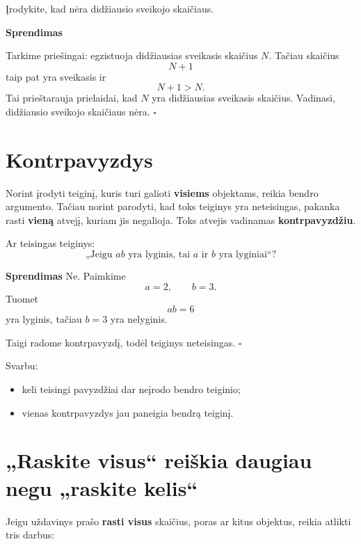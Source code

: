 \documentclass[11pt,a4paper]{scrartcl}
\newenvironment{solution}
    {\begin{list}{}{\setlength{\leftmargin}{10pt}\setlength{\rightmargin}{10pt}}\item[]}
    {\end{list}}
\begin{document}
\begin{example}
Įrodykite, kad nėra didžiausio sveikojo skaičiaus.
\end{example}

\begin{solution}
\textbf{Sprendimas}

Tarkime priešingai: egzistuoja didžiausias sveikasis skaičius $N$. Tačiau skaičius
\[
N+1
\]
taip pat yra sveikasis ir
\[
N+1>N.
\]
Tai prieštarauja prielaidai, kad $N$ yra didžiausias sveikasis skaičius.
Vadinasi, didžiausio sveikojo skaičiaus nėra. \hfill $\square$
\end{solution}

\section{Kontrpavyzdys}

Norint įrodyti teiginį, kuris turi galioti \textbf{visiems} objektams,
reikia bendro argumento. Tačiau norint parodyti, kad toks teiginys yra neteisingas, pakanka rasti
\textbf{vieną} atvejį, kuriam jis negalioja. Toks atvejis vadinamas \textbf{kontrpavyzdžiu}.

\begin{example}
Ar teisingas teiginys:
\[
\text{„Jeigu }ab\text{ yra lyginis, tai }a\text{ ir }b\text{ yra lyginiai“?}
\]
\end{example}

\begin{solution}
\textbf{Sprendimas}
Ne. Paimkime
\[
a=2,\qquad b=3.
\]
Tuomet
\[
ab=6
\]
yra lyginis, tačiau $b=3$ yra nelyginis.

Taigi radome kontrpavyzdį, todėl teiginys neteisingas. \hfill $\square$
\end{solution}

Svarbu:
\begin{itemize}
    \item keli teisingi pavyzdžiai dar neįrodo bendro teiginio;
    \item vienas kontrpavyzdys jau paneigia bendrą teiginį.
\end{itemize}

\section{„Raskite visus“ reiškia daugiau negu „raskite kelis“}

Jeigu uždavinys prašo \textbf{rasti visus} skaičius, poras ar kitus
objektus, reikia atlikti tris darbus:
\end{document}
